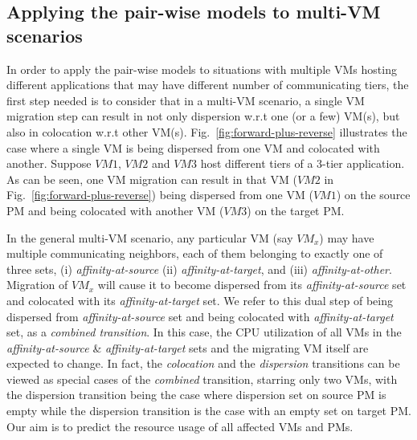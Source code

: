 \subsection{Applying the pair-wise models to multi-VM scenarios}
\label{sec:multi-vm}
In order to apply the pair-wise models to situations with multiple
VMs hosting different applications
that may have different number of communicating tiers, the
first step needed is to consider that in a multi-VM scenario,
a single VM migration step
can result in not only dispersion w.r.t one (or a few) VM(s), but
also in colocation w.r.t other VM(s).
Fig.~\ref{fig:forward-plus-reverse} illustrates the case where
a single VM is being dispersed from one VM and colocated with another.
Suppose $VM1$, $VM2$ and $VM3$ host different tiers of a 3-tier application.
As can be seen, one VM migration can result in that VM ($VM2$ in
Fig.~\ref{fig:forward-plus-reverse}) being dispersed from one VM ($VM1$)
on the source PM and being colocated with another VM ($VM3$) on
the target PM.

In the general multi-VM scenario, any particular VM (say $VM_{x}$)
may have multiple communicating neighbors, each of them belonging to
exactly one of three sets, (i) \textit{affinity-at-source}
(ii) \textit{affinity-at-target}, and (iii) \textit{affinity-at-other}.
Migration of $VM_{x}$ will cause it to become dispersed from
its \textit{affinity-at-source} set and colocated with its
\textit{affinity-at-target} set.
We refer to this dual step of being dispersed from
\textit{affinity-at-source} set and being colocated with
\textit{affinity-at-target} set, as a \textit{combined transition}.
In this case, the CPU utilization of all VMs in the
\textit{affinity-at-source} \& \textit{affinity-at-target} sets and
the migrating VM itself are expected to change.
In fact, the \textit{colocation}
and the \textit{dispersion} transitions can be viewed as
special cases of the \textit{combined} transition, starring only 
two VMs, with the dispersion transition being the case where 
dispersion set on source PM is empty while the dispersion transition 
is the case with an empty set on target PM.
Our aim is to predict the resource usage of all affected VMs and PMs.

